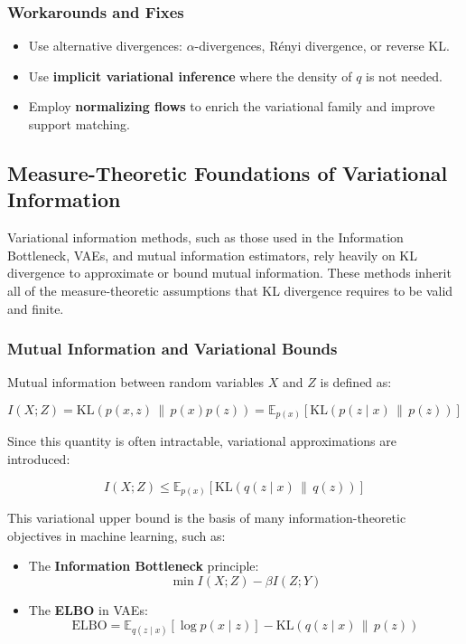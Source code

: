 \subsubsection{Workarounds and Fixes}

\begin{itemize}
    \item Use alternative divergences: \(\alpha\)-divergences, Rényi divergence, or reverse KL.
    \item Use \textbf{implicit variational inference} where the density of \( q \) is not needed.
    \item Employ \textbf{normalizing flows} to enrich the variational family and improve support matching.
\end{itemize}



\subsection{Measure-Theoretic Foundations of Variational Information}

Variational information methods, such as those used in the Information Bottleneck, VAEs, and mutual information estimators, rely heavily on KL divergence to approximate or bound mutual information. These methods inherit all of the measure-theoretic assumptions that KL divergence requires to be valid and finite.

\subsubsection{Mutual Information and Variational Bounds}

Mutual information between random variables \( X \) and \( Z \) is defined as:

\[
I(X; Z) = \mathrm{KL}(p(x, z) \,\|\, p(x)p(z)) = \mathbb{E}_{p(x)} \left[ \mathrm{KL}(p(z \mid x) \,\|\, p(z)) \right]
\]

Since this quantity is often intractable, variational approximations are introduced:

\[
I(X; Z) \leq \mathbb{E}_{p(x)} \left[ \mathrm{KL}(q(z \mid x) \,\|\, q(z)) \right]
\]

This variational upper bound is the basis of many information-theoretic objectives in machine learning, such as:

\begin{itemize}
    \item The \textbf{Information Bottleneck} principle:
    \[
    \min I(X; Z) - \beta I(Z; Y)
    \]
    \item The \textbf{ELBO} in VAEs:
    \[
    \mathrm{ELBO} = \mathbb{E}_{q(z \mid x)}[\log p(x \mid z)] - \mathrm{KL}(q(z \mid x) \,\|\, p(z))
    \]
\end{itemize}

